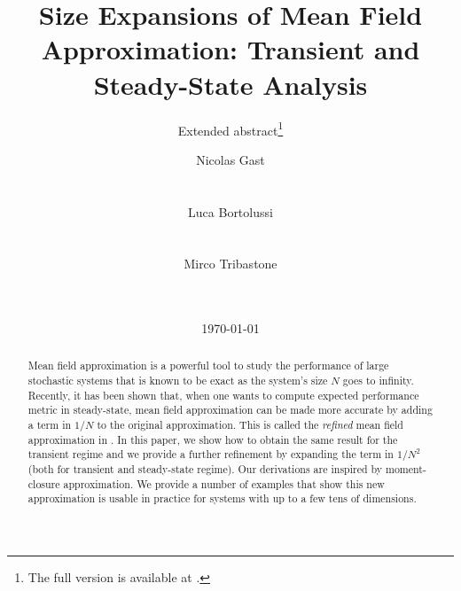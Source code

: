 \documentclass{sig-alternate-per-Performance2018}
\begin{document}

\title{Size Expansions of Mean Field Approximation: Transient and
  Steady-State Analysis}%
\subtitle{Extended abstract\thanks{The full version is available at
    \protect\cite{githubPaper2018}.}}

\author{
  \alignauthor
  Nicolas Gast\\
  \\%
  \\%
  \alignauthor
  Luca Bortolussi\\
  \\
  \\
  \alignauthor
  Mirco Tribastone\\
  \\
  \\
}

\date{\today}

\maketitle 


\begin{abstract}
  Mean field approximation is a powerful tool to study the performance
  of large stochastic systems that is known to be exact as the
  system's size $N$ goes to infinity. Recently, it has been shown
  that, when one wants to compute expected performance metric in
  steady-state, mean field approximation can be made more accurate by
  adding a term in $1/N$ to the original approximation. This is called
  the \emph{refined} mean field approximation in
  \cite{gast2017refined}.  In this paper, we show how to obtain the
  same result for the transient regime and we provide a further
  refinement by expanding the term in $1/N^2$ (both for transient and
  steady-state regime). Our derivations are inspired by moment-closure
  approximation. We provide a number of examples that show this new
  approximation is usable in practice for systems with up to a few
  tens of dimensions.
\end{abstract}

\end{document}

